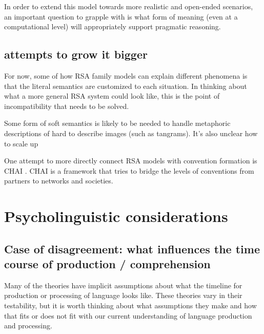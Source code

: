 \documentclass[]{article}
\begin{document}


In order to extend this model towards more realistic and open-ended scenarios, an important question to grapple with is what form of meaning (even at a computational level) will appropriately support pragmatic reasoning. 





\subsection{attempts to grow it bigger}


For now, some of how RSA family models can explain different phenomena is that the literal semantics are customized to each situation. In thinking about what a more general RSA system could look like, this is the point of incompatibility that needs to be solved. 

Some form of soft semantics is likely to be needed to handle metaphoric descriptions of hard to describe images (such as tangrams). It's also unclear how to scale up 

One attempt to more directly connect RSA models with convention formation is  CHAI \cite{hawkins2021}. CHAI is a framework that tries to bridge the levels of conventions from partners to networks and societies. 





\section{Psycholinguistic considerations}

\subsection{Case of disagreement: what influences the time course of production / comprehension }

Many of the theories have implicit assumptions about what the timeline for production or processing of language looks like. These theories vary in their testability, but it is worth thinking about what assumptions they make and how that fits or does not fit with our current understanding of language production and processing. 
\end{document}

